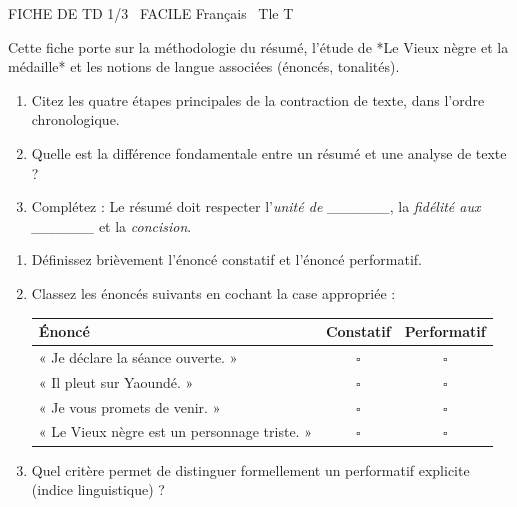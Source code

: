 \documentclass[11pt]{article}
\begin{document}
\begin{tcolorbox}[enhanced,colback=popink,colframe=popink,arc=10pt,boxrule=0pt,left=12pt,right=12pt,top=9pt,bottom=9pt]
{\color{white}\popxbold\small FICHE DE TD 1/3 \textbullet\ FACILE \hfill Français \textbullet\ Tle T\par}
\end{tcolorbox}
\vspace{4pt}
Cette fiche porte sur la méthodologie du résumé, l'étude de *Le Vieux nègre et la médaille* et les notions de langue associées (énoncés, tonalités).

\begin{exercice}
\begin{enumerate}
    \item Citez les quatre étapes principales de la contraction de texte, dans l'ordre chronologique.
    \item Quelle est la différence fondamentale entre un résumé et une analyse de texte ?
    \item Complétez : Le résumé doit respecter l'\textit{unité de \_\_\_\_\_\_}, la \textit{fidélité aux \_\_\_\_\_\_} et la \textit{concision}.
\end{enumerate}
\end{exercice}

\begin{exercice}
\begin{enumerate}
    \item Définissez brièvement l'énoncé constatif et l'énoncé performatif.
    \item Classez les énoncés suivants en cochant la case appropriée :
    \begin{tabular}{lcc}
        \toprule
        Énoncé & Constatif & Performatif \\
        \midrule
        « Je déclare la séance ouverte. » & $\square$ & $\square$ \\
        « Il pleut sur Yaoundé. » & $\square$ & $\square$ \\
        « Je vous promets de venir. » & $\square$ & $\square$ \\
        « Le Vieux nègre est un personnage triste. » & $\square$ & $\square$ \\
        \bottomrule
    \end{tabular}
    \item Quel critère permet de distinguer formellement un performatif explicite (indice linguistique) ?
\end{enumerate}
\end{exercice}
\end{document}
